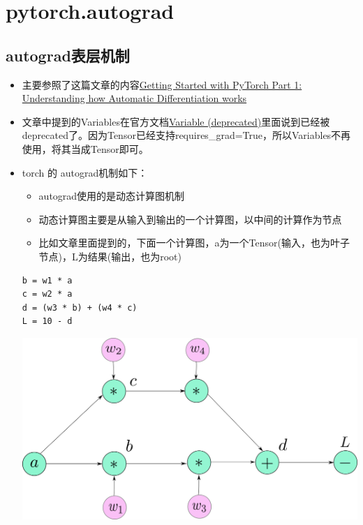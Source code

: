 \section{pytorch.autograd}

\subsection{autograd表层机制}
\begin{itemize}
\item
  主要参照了这篇文章的内容\href{https://towardsdatascience.com/getting-started-with-pytorch-part-1-understanding-how-automatic-differentiation-works-5008282073ec}{Getting
  Started with PyTorch Part 1: Understanding how Automatic
  Differentiation works}
\item
  文章中提到的Variables在官方文档\href{https://pytorch.org/docs/stable/autograd.html\#variable-deprecated}{Variable
  (deprecated)}里面说到已经被deprecated了。因为Tensor已经支持requires\_grad=True，所以Variables不再使用，将其当成Tensor即可。
\item
  torch 的 autograd机制如下：

  \begin{itemize}
  \tightlist
  \item
    autograd使用的是动态计算图机制
  \item
    动态计算图主要是从输入到输出的一个计算图，以中间的计算作为节点
  \item
    比如文章里面提到的，下面一个计算图，a为一个Tensor(输入，也为叶子节点)，L为结果(输出，也为root)
  \end{itemize}

\begin{verbatim}
b = w1 * a
c = w2 * a
d = (w3 * b) + (w4 * c)
L = 10 - d
\end{verbatim}

  \includegraphics[width=0.8\linewidth]{pytorch/pic/4-9.png}


\end{itemize}
